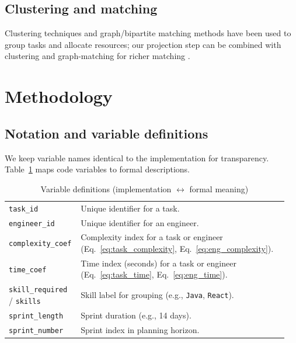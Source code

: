 \documentclass[journal]{IEEEtran}
\begin{document}
\subsection{Clustering and matching}
Clustering techniques and graph/bipartite matching methods have been used to group tasks and allocate resources; our projection step can be combined with clustering and graph-matching for richer matching \cite{clustering_tasks, bipartite_matching}.

\section{Methodology}\label{sec:method}

\subsection{Notation and variable definitions}
We keep variable names identical to the implementation for transparency. Table~\ref{tab:variables} maps code variables to formal descriptions.

\begin{table}[ht]
    \centering
    \caption{Variable definitions (implementation $\leftrightarrow$ formal meaning)}
    \label{tab:variables}
    \begin{tabular}{p{0.22\linewidth} p{0.73\linewidth}}
    \toprule
    \texttt{task\_id} & Unique identifier for a task. \\
    \texttt{engineer\_id} & Unique identifier for an engineer. \\
    \texttt{complexity\_coef} & Complexity index for a task or engineer (Eq.~\ref{eq:task_complexity}, Eq.~\ref{eq:eng_complexity}). \\
    \texttt{time\_coef} & Time index (seconds) for a task or engineer (Eq.~\ref{eq:task_time}, Eq.~\ref{eq:eng_time}). \\
    \texttt{skill\_required} / \texttt{skills} & Skill label for grouping (e.g., \texttt{Java}, \texttt{React}). \\
    \texttt{sprint\_length} & Sprint duration (e.g., 14 days). \\
    \texttt{sprint\_number} & Sprint index in planning horizon. \\
    \bottomrule
    \end{tabular}
\end{table}
\end{document}
